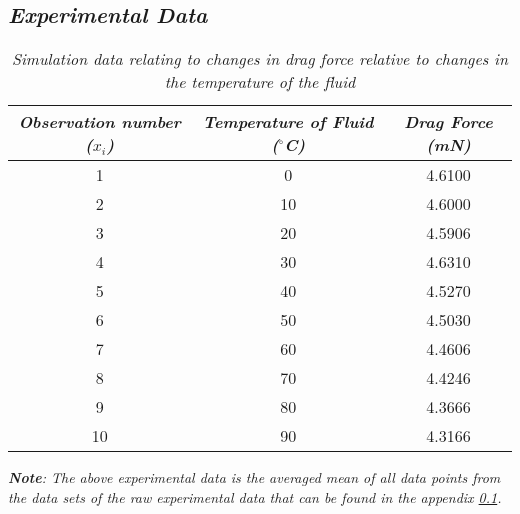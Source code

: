 

\subsection{\textit{Experimental Data}}

	\begin{table}[H]
		\centering
		\begin{tabular}{|c|c|c|}
			\hline
			\hline
			\textit{Observation number ($x_i$)} & \textit{Temperature of Fluid ($^\circ$C)} & \textit{Drag Force (mN)} \\
			\hline
			\hline
			1 & 0 & 4.6100 \\
			\hline
			2 & 10 & 4.6000 \\
			\hline
			3 & 20 & 4.5906 \\
			\hline
			4 & 30 & 4.6310 \\
			\hline
			5 & 40 & 4.5270 \\
			\hline
			6 & 50 & 4.5030 \\
			\hline
			7 & 60 & 4.4606 \\
			\hline
			8 & 70 & 4.4246 \\
			\hline
			9 & 80 & 4.3666 \\
			\hline
			10 & 90 & 4.3166 \\
			\hline
			\hline
		\end{tabular}
		\caption{\textit{Simulation data relating to changes in drag force relative to changes in the temperature of the fluid}}
		\label{simdat}
	\end{table}

	\textit{\textbf{Note}: The above experimental data is the averaged mean of all data points from the data sets of the raw experimental data that can be found in the appendix \ref{}.}


